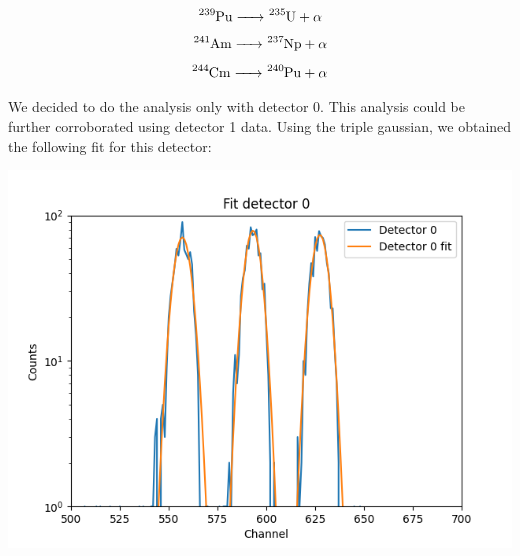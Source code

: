 \documentclass{article}
\begin{document}
\begin{multicols}{2}
\begin{equation}
    \ce{ ^{239}Pu -> ^{235}U + \alpha}
\end{equation}
\begin{equation}
    \ce{ ^{241}Am -> ^{237}Np + \alpha}
\end{equation}
\begin{equation}
    \ce{ ^{244}Cm -> ^{240}Pu + \alpha}
\end{equation}



We decided to do the analysis only with detector 0. This analysis could be further corroborated using detector 1 data.
Using the triple gaussian, we obtained the following fit for this detector:

\begin{center}
    \label{TT_21}
    \centering
    \includegraphics[scale = 0.5]{../../images/TT_21_Chn0.png}
\end{center}

%


\end{multicols}
\end{document}
